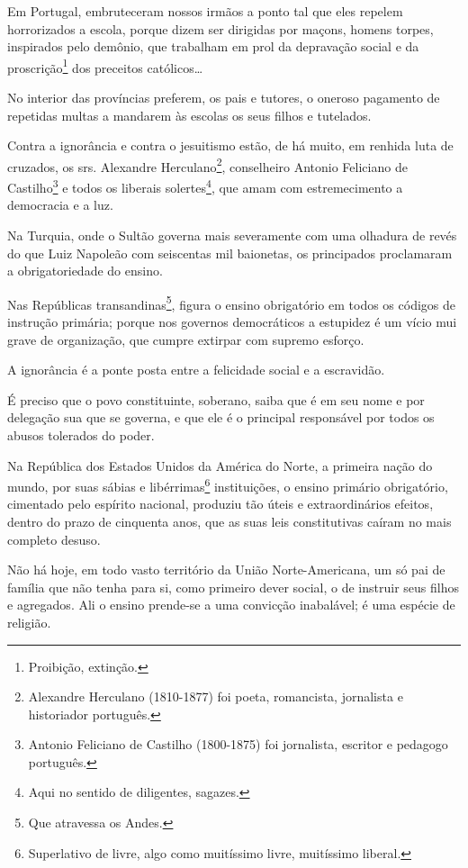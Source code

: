 Em Portugal, embruteceram nossos irmãos a ponto tal que eles repelem
horrorizados a escola, porque dizem ser dirigidas por maçons, homens
torpes, inspirados pelo demônio, que trabalham em prol da depravação
social e da proscrição\footnote{Proibição, extinção.} dos preceitos
católicos\ldots

No interior das províncias preferem, os pais e tutores, o oneroso
pagamento de repetidas multas a mandarem às escolas os seus filhos e
tutelados.

Contra a ignorância e contra o jesuitismo estão, de há muito, em renhida
luta de cruzados, os srs. Alexandre Herculano\footnote{Alexandre
  Herculano (1810-1877) foi poeta, romancista, jornalista e historiador
  português.}, conselheiro Antonio Feliciano de Castilho\footnote{
  Antonio Feliciano de Castilho (1800-1875) foi jornalista, escritor e
  pedagogo português.} e todos os liberais solertes\footnote{Aqui no
  sentido de diligentes, sagazes.}, que amam com estremecimento a
democracia e a luz.

Na Turquia, onde o Sultão governa mais severamente com uma olhadura de
revés do que Luiz Napoleão com seiscentas mil baionetas, os principados
proclamaram a obrigatoriedade do ensino.

Nas Repúblicas transandinas\footnote{Que atravessa os Andes.}, figura
o ensino obrigatório em todos os códigos de instrução primária; porque
nos governos democráticos a estupidez é um vício mui grave de
organização, que cumpre extirpar com supremo esforço.

A ignorância é a ponte posta entre a felicidade social e a escravidão.

É preciso que o povo constituinte, soberano, saiba que é em seu nome e
por delegação sua que se governa, e que ele é o principal responsável
por todos os abusos tolerados do poder.

Na República dos Estados Unidos da América do Norte, a primeira nação do
mundo, por suas sábias e libérrimas\footnote{Superlativo de livre,
  algo como muitíssimo livre, muitíssimo liberal.} instituições, o
ensino primário obrigatório, cimentado pelo espírito nacional, produziu
tão úteis e extraordinários efeitos, dentro do prazo de cinquenta anos,
que as suas leis constitutivas caíram no mais completo desuso.

Não há hoje, em todo vasto território da União Norte-Americana, um só
pai de família que não tenha para si, como primeiro dever social, o de
instruir seus filhos e agregados. Ali o ensino prende-se a uma convicção
inabalável; é uma espécie de religião.

